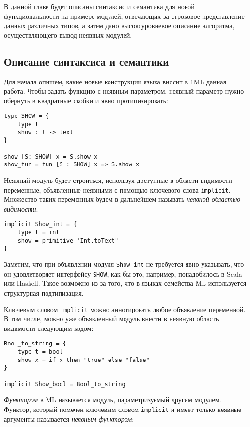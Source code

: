 \documentclass[../diploma.tex]{subfiles}
\begin{document}
\label{sec:1}

В данной главе будет описаны синтаксис и семантика для новой функциональности на примере модулей, отвечающих за строковое представление данных различных типов, а затем дано высокоуровневое описание алгоритма, осуществляющего вывод неявных модулей.

\subsection{Описание синтаксиса и семантики}

Для начала опишем, какие новые конструкции языка вносит в 1ML данная работа. Чтобы задать функцию с неявным параметром, неявный параметр нужно обернуть в квадратные скобки и явно протипизировать:

\begin{verbatim}
type SHOW = {
    type t
    show : t -> text
}

show [S: SHOW] x = S.show x
show_fun = fun [S : SHOW] x => S.show x
\end{verbatim}

Неявный модуль будет строиться, используя доступные в области видимости переменные, объявленные неявными с помощью ключевого слова \texttt{implicit}. Множество таких переменных будем в дальнейшем называть \textit{неявной областью видимости}.

\begin{verbatim}
implicit Show_int = {
    type t = int
    show = primitive "Int.toText"
}
\end{verbatim}

Заметим, что при объявлении модуля \texttt{Show_int} не требуется явно указывать, что он удовлетворяет интерфейсу \texttt{SHOW}, как бы это, например, понадобилось в Scala или Haskell. Такое возможно из-за того, что в языках семейства ML используется структурная подтипизация.

Ключевым словом \texttt{implicit} можно аннотировать любое объявление переменной. В том числе, можно уже объявленный модуль внести в неявную область видимости следующим кодом:

\begin{verbatim}
Bool_to_string = {
    type t = bool
    show x = if x then "true" else "false"
}

implicit Show_bool = Bool_to_string
\end{verbatim}

\textit{Функтором} в ML называется модуль, параметризуемый другим модулем. Функтор, который помечен ключевым словом \texttt{implicit} и имеет только неявные аргументы называется \textit{неявным функтором}:
\end{document}
